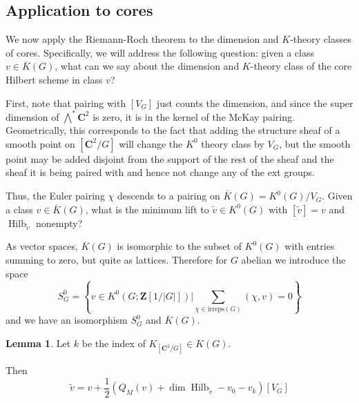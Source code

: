 \documentclass{amsart}[12pt]
\theoremstyle{definition}
\newtheorem{lemma}[dummy]{Lemma}
\newcommand{\Z}{\mathbf{Z}}
\newcommand{\C}{\mathbf{C}}
\newcommand{\irreps}{\text{irreps}}
\DeclareMathOperator{\Hilb}{Hilb}
\begin{document}
\subsection{Application to cores}

We now apply the Riemann-Roch theorem to the dimension and $K$-theory classes of cores.  Specifically, we will address the following question: given a class $v\in \overline{K}(G)$, what can we say about the dimension and $K$-theory class of the core Hilbert scheme in class $v$?

First, note that pairing with $[V_G]$ just counts the dimension, and since the super dimension of $\bigwedge^*\C^2$ is zero, it is in the kernel of the McKay pairing.  Geometrically, this corresponds to the fact that adding the structure sheaf of a smooth point on $[\C^2/G]$ will change the $K^0$ theory class by $V_G$, but the smooth point may be added disjoint from the support of the rest of the sheaf and the sheaf it is being paired with and hence not change any of the ext groups.


Thus, the Euler pairing $\chi$ descends to a pairing on $\overline{K}(G)=K^0(G)/V_G$.  Given a class $v\in \overline{K}(G)$, what is the minimum lift to $\tilde{v}\in K^0(G)$ with $[\tilde{v}]=v$ and $\Hilb_{\tilde{v}}$ nonempty?

As vector spaces, $\overline{K}(G)$ is isomorphic to the subset of $K^0(G)$ with entries summing to zero, but quite as lattices.  Therefore for $G$ abelian we introduce the space 
$$S^0_G=\left\{v\in K^0(G; \Z[1/|G|])\Bigg | \sum_{\chi\in\irreps(G)}(\chi, v)=0\right\}$$
and we have an isomorphism $S^0_G$ and $\overline{K}(G)$.  


\begin{lemma}
Let $k$ be the index of $K_{[\C^2/G]}\in K(G)$.

Then
$$\tilde{v}=v+\frac{1}{2}\left(Q_M(v)+\dim\Hilb_{\tilde{v}} -v_0-v_{k}\right)[V_G]$$
\end{lemma}
\end{document}
